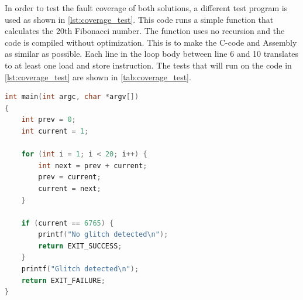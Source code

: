 

In order to test the fault coverage of both solutions, a different test program is used as shown in \autoref{lst:coverage_test}. This code runs a simple function that calculates the 20th Fibonacci number. The function uses no recursion and the code is compiled without optimization. This is to make the C-code and Assembly as similar as possible. Each line in the loop body between line 6 and 10 translates to at least one load and store instruction. The tests that will run on the code in \autoref{lst:coverage_test} are shown in \autoref{tab:coverage_test}. 


\begin{lstlisting}[caption={A sample C++ code}, label=lst:coverage_test, language=C++]
int main(int argc, char *argv[])
{
    int prev = 0;
    int current = 1;

    for (int i = 1; i < 20; i++) {
        int next = prev + current;
        prev = current;
        current = next;
    }

    if (current == 6765) {
        printf("No glitch detected\n");
        return EXIT_SUCCESS;
    }
    printf("Glitch detected\n");
    return EXIT_FAILURE;
}
\end{lstlisting}

